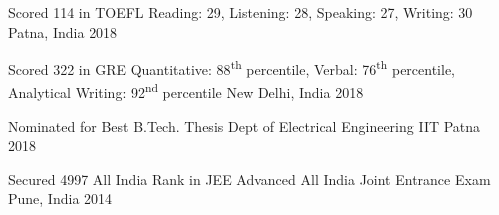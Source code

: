 
\begin{cvhonors}

\cvhonor
	{Scored 114 in TOEFL} %
	{Reading: 29, Listening: 28, Speaking: 27, Writing: 30} %
	{Patna, India} %
	{2018} %

\cvhonor
	{Scored 322 in GRE} %
	{Quantitative: 88\textsuperscript{th} percentile, Verbal: 76\textsuperscript{th} percentile, Analytical Writing: 92\textsuperscript{nd} percentile} %
	{New Delhi, India} %
	{2018} %

\cvhonor
	{Nominated for Best B.Tech. Thesis} %
	{Dept of Electrical Engineering} %
	{IIT Patna} %
	{2018} %

\cvhonor
	{Secured 4997 All India Rank in JEE Advanced} %
	{All India Joint Entrance Exam} %
	{Pune, India} %
	{2014} %

\end{cvhonors}
